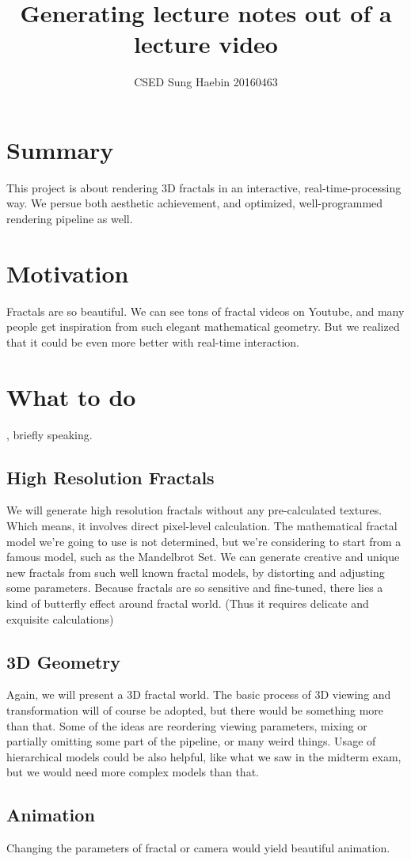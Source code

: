 \documentclass[a4paper]{article}
\title{Generating lecture notes out of a lecture video}
\author{CSED Sung Haebin 20160463}
\begin{document}
\maketitle
\section{Summary}
This project is about rendering 3D fractals in an interactive, real-time-processing way.
We persue both aesthetic achievement, and optimized, well-programmed rendering pipeline as well.
\section{Motivation}
Fractals are so beautiful.
We can see tons of fractal videos on Youtube, and many people get inspiration from such elegant mathematical geometry.
But we realized that it could be even more better with real-time interaction.
\section{What to do}
, briefly speaking.
\subsection{High Resolution Fractals}
We will generate high resolution fractals without any pre-calculated textures.
Which means, it involves direct pixel-level calculation.
The mathematical fractal model we're going to use is not determined, but we're considering to start from a famous model, such as the Mandelbrot Set.
We can generate creative and unique new fractals from such well known fractal models, by distorting and adjusting some parameters.
Because fractals are so sensitive and fine-tuned, there lies a kind of butterfly effect around fractal world.
(Thus it requires delicate and exquisite calculations)
\subsection{3D Geometry}
Again, we will present a 3D fractal world.
The basic process of 3D viewing and transformation will of course be adopted, but there would be something more than that.
Some of the ideas are reordering viewing parameters, mixing or partially omitting some part of the pipeline, or many weird things.
Usage of hierarchical models could be also helpful, like what we saw in the midterm exam, but we would need more complex models than that.
\subsection{Animation}
Changing the parameters of fractal or camera would yield beautiful animation.
\end{document}

